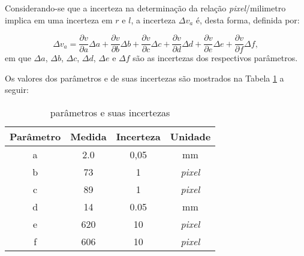 Considerando-se que a incerteza na determina\c{c}\~{a}o da rela\c{c}\~{a}o \emph{pixel}/milimetro implica em uma incerteza em $r$ e $l$, a incerteza  $\Delta v_a$  \'{e}, desta forma, definida por:

\begin{equation}
\label {eqincerteza}
\Delta v_a = \frac{{\partial v}}{{\partial a}}\Delta a + \frac{{\partial v}}{{\partial b}}\Delta b + \frac{{\partial v}}{{\partial c}}\Delta c + \frac{{\partial v}}{{\partial d}}\Delta d + \frac{{\partial v}}{{\partial e}}\Delta e + \frac{{\partial v}}{{\partial f}}\Delta f,
\end{equation}
em que $\Delta a$, $\Delta b$, $\Delta c$, $\Delta d$, $\Delta e$ e $\Delta f$  s\~{a}o as incertezas dos respectivos par\^{a}metros.

Os valores dos par\^{a}metros e de suas incertezas s\~{a}o mostrados na Tabela \ref{deriva} a seguir:

\begin{table}[!htbp]
\centering \caption{\label{deriva} par\^{a}metros e suas incertezas}
\begin{tabular}{ c | c c c}
  \hline
  Par\^{a}metro & Medida & Incerteza & Unidade\\
  \hline
  a & 2.0  & 0,05 & mm\\
  b & 73 & 1  & \emph{pixel}\\
  c & 89 & 1 & \emph{pixel}\\
  d & 14 & 0.05 & mm \\
  e & 620 & 10 & \emph{pixel}\\
  f & 606 & 10 & \emph{pixel}\\
  \hline
\end{tabular}\\
\end{table}











